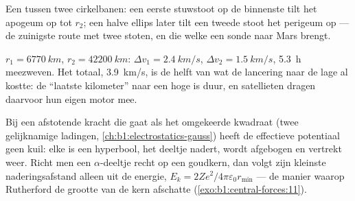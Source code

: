 \begin{omfigure}

{\small Een  tussen twee cirkelbanen: een eerste stuwstoot op
de binnenste  tilt het apogeum op tot $r_2$; een halve ellips later tilt een
tweede stoot het perigeum op --- de zuinigste route met twee stoten, en
die welke een sonde naar Mars brengt.}
\end{omfigure}

\begin{example}\label{ex:b1:central-forces:leogeo}
$r_1 = \qty{6770}{km}$, $r_2 = \qty{42200}{km}$: $\Delta v_1 = \qty{2.4}{km/s}$,
$\Delta v_2 = \qty{1.5}{km/s}$, \qty{5.3}{h} meezweven. Het totaal,
\qty{3.9}{km/s}, is de helft van wat de lancering naar de lage  al kostte: de
``laatste kilometer'' naar een hoge  is duur, en satellieten dragen daarvoor
hun eigen motor mee.
\end{example}

\begin{remark}\label{rem:b1:central-forces:rutherford}
Bij een afstotende kracht die gaat als het omgekeerde kwadraat (twee gelijknamige ladingen,
\cref{ch:b1:electrostatics-gauss}) heeft de effectieve potentiaal geen kuil:
elke  is een hyperbool, het deeltje nadert, wordt afgebogen
en vertrekt weer. Richt men een $\alpha$-deeltje recht op een goudkern, dan volgt zijn
kleinste naderingsafstand alleen uit de energie, $E_k =
2Ze^2/4\pi\varepsilon_0 r_{\min}$ --- de manier waarop Rutherford de grootte van
de kern afschatte (\cref{exo:b1:central-forces:11}).
\end{remark}

